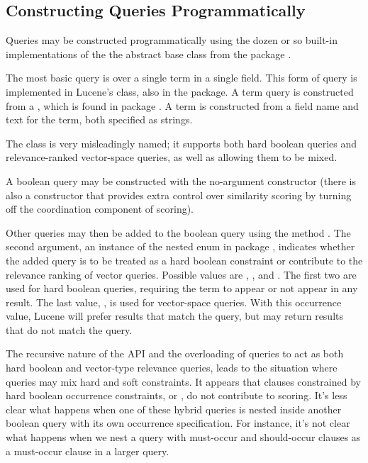 \subsection{Constructing Queries Programmatically}

Queries may be constructed programmatically using the dozen or so
built-in implementations of the the  abstract base class
from the package .  

The most basic query is over a single term in a single field.  This
form of query is implemented in Lucene's  class, also
in the  package.  A term query is constructed from a
, which is found in package .
A term is constructed from a field name and text for the term, both
specified as strings.

The  class is very misleadingly named; it
supports both hard boolean queries and relevance-ranked vector-space
queries, as well as allowing them to be mixed.

A boolean query may be constructed with the no-argument constructor
 (there is also a constructor that provides extra
control over similarity scoring by turning off the coordination component
of scoring).

Other queries may then be added to the boolean query using the method
.  The second argument, an
instance of the nested enum  in package
, indicates whether the added query is to be treated as a
hard boolean constraint or contribute to the relevance ranking of
vector queries.  Possible values are ,
, and .  The
first two are used for hard boolean queries, requiring the term to
appear or not appear in any result.  The last value, , is
used for vector-space queries.  With this occurrence value, Lucene
will prefer results that match the query, but may return results that
do not match the query.%

The recursive nature of the API and the overloading of queries to act
as both hard boolean and vector-type relevance queries, leads to the
situation where queries may mix hard and soft constraints.  It appears
that clauses constrained by hard boolean occurrence constraints,
 or , do not contribute to scoring.  It's
less clear what happens when one of these hybrid queries is nested
inside another boolean query with its own occurrence specification.
For instance, it's not clear what happens when we nest a query with
must-occur and should-occur clauses as a must-occur clause in a larger
query.
%


